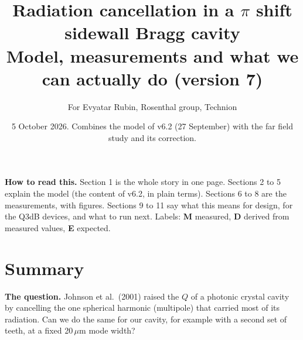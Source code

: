 \documentclass[11pt,a4paper]{article}
\title{Radiation cancellation in a $\pi$ shift sidewall Bragg cavity\\[3pt]
\large Model, measurements and what we can actually do (version 7)}
\author{For Evyatar Rubin, Rosenthal group, Technion}
\date{5 October 2026. Combines the model of v6.2 (27 September) with the far field study and its correction.}
\begin{document}
\maketitle

\textbf{How to read this.} Section 1 is the whole story in one page. Sections 2 to 5 explain the model (the content
of v6.2, in plain terms). Sections 6 to 8 are the measurements, with figures. Sections 9 to 11 say what this means for
design, for the Q3dB devices, and what to run next. Labels: \textbf{M} measured, \textbf{D} derived from measured
values, \textbf{E} expected.

\section{Summary}
\textbf{The question.} Johnson et al.\ (2001) raised the $Q$ of a photonic crystal cavity by cancelling the one
spherical harmonic (multipole) that carried most of its radiation. Can we do the same for our cavity, for example
with a second set of teeth, at a fixed 20\,$\mu$m mode width?
\end{document}
